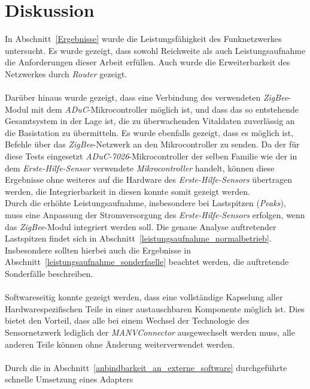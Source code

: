 
\chapter{Diskussion}\label{Diskussion}
In Abschnitt~\ref{Ergebnisse} wurde die Leistungsfähigkeit des Funknetzwerkes untersucht.
Es wurde gezeigt, dass sowohl Reichweite als auch Leistungsaufnahme die Anforderungen
dieser Arbeit erfüllen. Auch wurde die Erweiterbarkeit des Netzwerkes durch \emph{Router} gezeigt.\\
\\
Darüber hinaus wurde gezeigt, dass eine Verbindung des verwendeten \emph{ZigBee}-Modul
mit dem \emph{ADuC}-Mikrocontroller möglich ist, und dass das so entstehende Gesamtsystem
in der Lage ist, die zu überwachenden Vitaldaten zuverlässig an die Basistation zu übermitteln.
Es wurde ebenfalls gezeigt, dass es möglich ist, Befehle über das \emph{ZigBee}-Netzwerk
an den Mikrocontroller zu senden. Da der für diese Tests eingesetzt \emph{ADuC-7026}-Mikrocontroller
der selben Familie wie der in dem \emph{Erste-Hilfe-Sensor} verwendete \emph{Mikrocontroller} handelt,
können diese Ergebnisse ohne weiteres auf die Hardware des \emph{Erste-Hilfe-Sensors} übertragen werden, 
die Integrierbarkeit in diesen konnte somit gezeigt werden.\\
Durch die erhöhte Leistungsaufnahme, insbesondere bei Lastspitzen (\emph{Peaks}), muss eine Anpassung
der Stromversorgung des \emph{Erste-Hilfe-Sensors} erfolgen, wenn das \emph{ZigBee}-Modul integriert
werden soll. Die genaue Analyse auftretender Lastspitzen findet sich in Abschnitt~\ref{leistungsaufnahme_normalbetrieb}.
Insbesondere sollten hierbei auch die Ergebnisse in Abschnitt~\ref{leistungsaufnahme_sonderfaelle} beachtet 
werden, die auftretende Sonderfälle beschreiben.\\
\\
Softwareseitig konnte gezeigt werden, dass eine vollständige Kapselung aller Hardwarespezifischen Teile
in einer austauschbaren Komponente möglich ist. Dies bietet den Vorteil, dass alle bei einem Wechsel 
der Technologie des Sensornetzwerk lediglich der \emph{MANVConnector} ausgewechselt werden muss,
alle anderen Teile können ohne Änderung weiterverwendet werden.\\
\\
Durch die in Abschnitt~\ref{anbindbarkeit_an_externe_software} durchgeführte schnelle Umsetzung eines Adapters 
